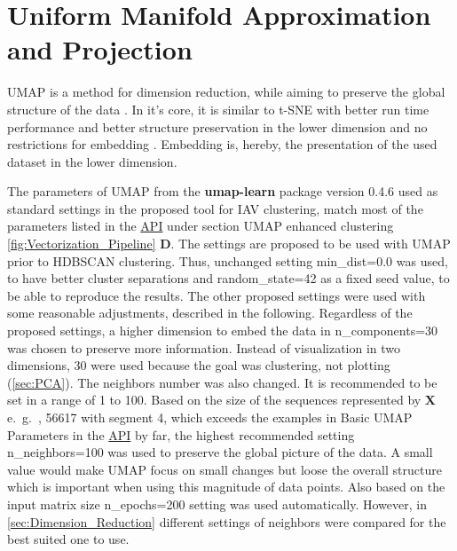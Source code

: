\section{Uniform Manifold Approximation and Projection} \label{sec:UMAP}

\gls{UMAP} is a method for dimension reduction, while aiming to preserve the global structure of the data \autocite{mcinnes_umap_2020}. In it's core, it is similar to \gls{t-SNE} with better run time performance and better structure preservation in the lower dimension and no restrictions for embedding \autocite{maaten_visualizing_2008, mcinnes_umap_2020}. Embedding is, hereby, the presentation of the used dataset in the lower dimension.

The parameters of \gls{UMAP} from the \textbf{umap-learn} package version 0.4.6 used as standard settings in the proposed tool for \gls{IAV} clustering, match most of the parameters listed in the \href{https://umap-learn.readthedocs.io/en/latest/api.html}{API} under section \glqq \gls{UMAP} enhanced clustering\grqq{} \autoref{fig:Vectorization_Pipeline} \textsf{\textbf{D}}. The settings are proposed to be used with \gls{UMAP} prior to \gls{HDBSCAN} clustering. Thus, unchanged setting \colorbox{backcolour}{min\_dist=0.0} was used, to have better cluster separations and \colorbox{backcolour}{random\_state=42} as a fixed seed value, to be able to reproduce the results. The other proposed settings were used with some reasonable adjustments, described in the following. Regardless of the proposed settings, a higher dimension to embed the data in \colorbox{backcolour}{n\_components=30} was chosen to preserve more information. Instead of visualization in two dimensions, 30 were used because the goal was clustering, not plotting (\autoref{sec:PCA}). The neighbors number was also changed. It is recommended to be set in a range of 1 to 100. Based on the size of the sequences represented by $\mathbf{X}$ e.~g.~, 56617 with segment 4, which exceeds the examples in \glqq Basic UMAP Parameters\grqq{} in the \href{https://umap-learn.readthedocs.io/en/latest/api.html}{API} by far, the highest recommended setting \colorbox{backcolour}{n\_neighbors=100} was used to preserve the global picture of the data. A small value would make \gls{UMAP} focus on small changes but loose the overall structure which is important when using this magnitude of data points. Also based on the input matrix size \colorbox{backcolour}{n\_epochs=200} setting was used automatically. However, in \autoref{sec:Dimension_Reduction} different settings of neighbors were compared for the best suited one to use.

